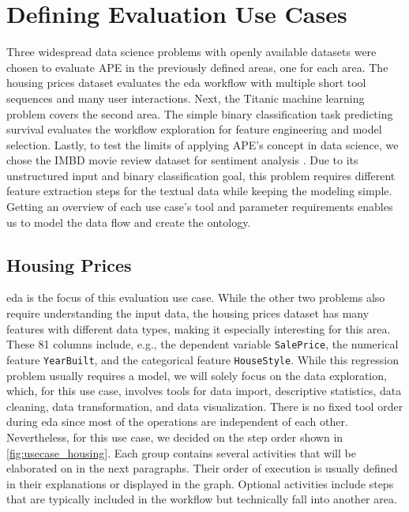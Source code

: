 \section{Defining Evaluation Use Cases}
Three widespread data science problems with openly available datasets were chosen to evaluate APE in the previously defined areas, one for each area. The housing prices dataset \cite{house-prices-Data} evaluates the \ac{eda} workflow with multiple short tool sequences and many user interactions. Next, the Titanic machine learning problem \cite{titanicData} covers the second area. The simple binary classification task predicting survival evaluates the workflow exploration for feature engineering and model selection. Lastly, to test the limits of applying APE’s concept in data science, we chose the IMBD movie review dataset for sentiment analysis \cite{IMBDData}. Due to its unstructured input and binary classification goal, this problem requires different feature extraction steps for the textual data while keeping the modeling simple. Getting an overview of each use case's tool and parameter requirements enables us to model the data flow and create the ontology.

\subsection{Housing Prices}
\ac{eda} is the focus of this evaluation use case. While the other two problems also require understanding the input data, the housing prices dataset has many features with different data types, making it especially interesting for this area. These 81 columns include, e.g., the dependent variable \verb|SalePrice|, the numerical feature \verb|YearBuilt|, and the categorical feature \verb|HouseStyle|. While this regression problem usually requires a model, we will solely focus on the data exploration, which, for this use case, involves tools for data import, descriptive statistics, data cleaning, data transformation, and data visualization. There is no fixed tool order during \ac{eda} since most of the operations are independent of each other. Nevertheless, for this use case, we decided on the step order shown in \autoref{fig:usecase_housing}. Each group contains several activities that will be elaborated on in the next paragraphs. Their order of execution is usually defined in their explanations or displayed in the graph. Optional activities include steps that are typically included in the workflow but technically fall into another area.

